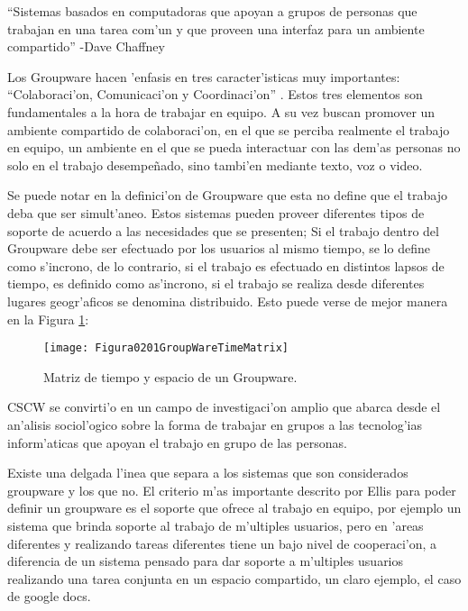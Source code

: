 \medskip 
``Sistemas basados en computadoras que apoyan a grupos de personas que trabajan en una tarea com'un y que proveen una interfaz para un ambiente compartido'' -Dave Chaffney
\medskip

Los Groupware hacen 'enfasis en tres caracter'isticas muy importantes: ``Colaboraci'on, Comunicaci'on y Coordinaci'on''  \cite{ellis1991groupware}. Estos tres elementos son fundamentales a la hora de trabajar en equipo. A su vez buscan promover un ambiente compartido de colaboraci'on, en el que se perciba realmente el trabajo en equipo, un ambiente en el que se pueda interactuar con las dem'as personas no solo en el trabajo desempe\~nado, sino tambi'en mediante texto, voz o video.

\medskip
Se puede notar en la definici'on de Groupware que esta no define que el trabajo deba que ser simult'aneo. Estos sistemas pueden proveer diferentes tipos de soporte de acuerdo a las necesidades que se presenten; Si el trabajo dentro del Groupware debe ser efectuado por los usuarios al mismo tiempo, se lo define como s'incrono, de lo contrario, si el trabajo es efectuado en distintos lapsos de tiempo, es definido como as'incrono, si el trabajo se realiza desde diferentes lugares geogr'aficos se denomina distribuido. Esto puede verse de mejor manera en la Figura \ref{fig:GroupWareTimeMatrix}:

\begin{figure}[ht]
\centering
\texttt{[image: Figura0201GroupWareTimeMatrix]}
\caption{Matriz de tiempo y espacio de un Groupware.}
\cite{ellis1991groupware}
\label{fig:GroupWareTimeMatrix}
\end{figure}
\medskip

CSCW se convirti'o en un campo de investigaci'on amplio que abarca desde el an'alisis sociol'ogico sobre la forma de trabajar en grupos a las tecnolog'ias inform'aticas que apoyan el trabajo en grupo de las personas. 

\medskip
Existe una delgada l'inea que separa a los sistemas que son considerados groupware y los que no. El criterio m'as importante descrito por Ellis \cite{ellis1991groupware} para poder definir un groupware es el soporte que ofrece al trabajo en equipo, por ejemplo un sistema que brinda soporte al trabajo de m'ultiples usuarios, pero en 'areas diferentes y realizando tareas diferentes tiene un bajo nivel de cooperaci'on, a diferencia de un sistema pensado para dar soporte a m'ultiples usuarios realizando una tarea conjunta en un espacio compartido, un claro ejemplo, el caso de google docs.

